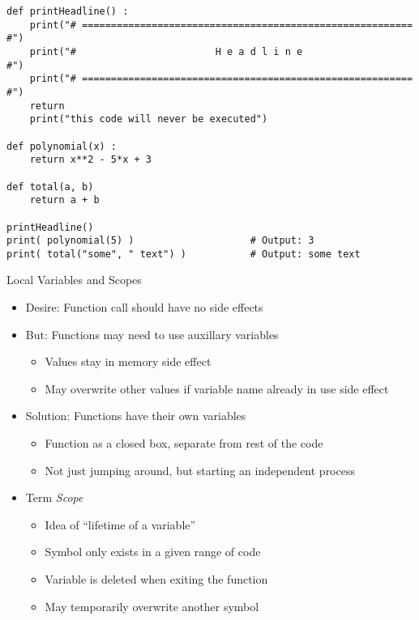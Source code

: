 \begin{frame}[fragile]
%
\begin{codebox}
\begin{verbatim}
def printHeadline() :
    print("# ========================================================= #")
    print("#                        H e a d l i n e                    #")
    print("# ========================================================= #")
    return
    print("this code will never be executed")

def polynomial(x) :
    return x**2 - 5*x + 3

def total(a, b)
    return a + b
    
printHeadline()
print( polynomial(5) )                    # Output: 3
print( total("some", " text") )           # Output: some text
\end{verbatim}
\end{codebox}
%
\end{frame}


\begin{frame}{Local Variables and Scopes}
%
\begin{itemize}
\item Desire: Function call should have no side effects
\item But: Functions may need to use auxillary variables
	\begin{itemize}
	\item Values stay in memory \thus side effect
	\item May overwrite other values if variable name already in use \thus side effect
	\end{itemize}
\item Solution: Functions have their own variables
	\begin{itemize}
	\item Function as a closed box, separate from rest of the code
	\item Not just jumping around, but starting an independent process
	\end{itemize}
\item Term \emph{Scope}
	\begin{itemize}
	\item Idea of \enquote{lifetime of a variable}
	\item Symbol only exists in a given range of code
	\item Variable is deleted when exiting the function
	\item May temporarily overwrite another symbol
	\end{itemize}
\end{itemize}
%
\end{frame}

